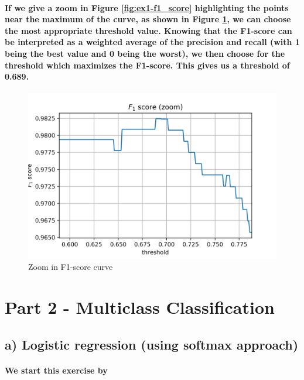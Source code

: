 \documentclass[a4paper]{article}
\begin{document}
\paragraph{If we give a zoom in Figure \ref{fig:ex1-f1_score} highlighting the points near the maximum of the curve, as shown in Figure \ref{fig:ex1-f1_score_zoom}, we can choose the most appropriate threshold value. Knowing that the F1-score can be interpreted as a weighted average of the precision and recall (with 1 being the best value and 0 being the worst), we then choose for the threshold which maximizes the F1-score. This gives us a threshold of 0.689.}

\begin{figure}[H]
    \centering
    \includegraphics[width=12cm]{F1_score_zoom}
    \caption{Zoom in F1-score curve}
    \label{fig:ex1-f1_score_zoom}
\end{figure}

\section{Part 2 - Multiclass Classification}

\subsection{a) Logistic regression (using softmax approach)}

\paragraph{We start this exercise by }
\end{document}
